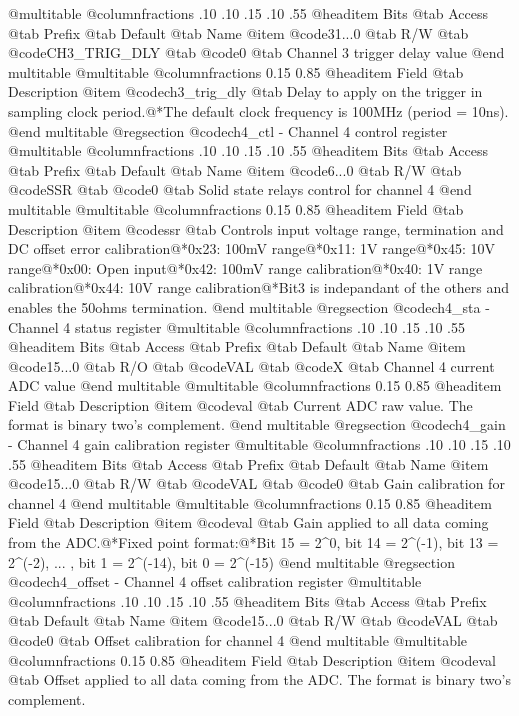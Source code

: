 @multitable @columnfractions .10 .10 .15 .10 .55
@headitem Bits @tab Access @tab Prefix @tab Default @tab Name
@item @code{31...0}
@tab R/W @tab
@code{CH3_TRIG_DLY}
@tab @code{0} @tab 
Channel 3 trigger delay value
@end multitable
@multitable @columnfractions 0.15 0.85
@headitem Field @tab Description
@item @code{ch3_trig_dly} @tab Delay to apply on the trigger in sampling clock period.@*The default clock frequency is 100MHz (period = 10ns).
@end multitable
@regsection @code{ch4_ctl} - Channel 4 control register
@multitable @columnfractions .10 .10 .15 .10 .55
@headitem Bits @tab Access @tab Prefix @tab Default @tab Name
@item @code{6...0}
@tab R/W @tab
@code{SSR}
@tab @code{0} @tab 
Solid state relays control for channel 4
@end multitable
@multitable @columnfractions 0.15 0.85
@headitem Field @tab Description
@item @code{ssr} @tab Controls input voltage range, termination and DC offset error calibration@*0x23: 100mV range@*0x11: 1V range@*0x45: 10V range@*0x00: Open input@*0x42: 100mV range calibration@*0x40: 1V range calibration@*0x44: 10V range calibration@*Bit3 is indepandant of the others and enables the 50ohms termination.
@end multitable
@regsection @code{ch4_sta} - Channel 4 status register
@multitable @columnfractions .10 .10 .15 .10 .55
@headitem Bits @tab Access @tab Prefix @tab Default @tab Name
@item @code{15...0}
@tab R/O @tab
@code{VAL}
@tab @code{X} @tab 
Channel 4 current ADC value
@end multitable
@multitable @columnfractions 0.15 0.85
@headitem Field @tab Description
@item @code{val} @tab Current ADC raw value. The format is binary two's complement.
@end multitable
@regsection @code{ch4_gain} - Channel 4 gain calibration register
@multitable @columnfractions .10 .10 .15 .10 .55
@headitem Bits @tab Access @tab Prefix @tab Default @tab Name
@item @code{15...0}
@tab R/W @tab
@code{VAL}
@tab @code{0} @tab 
Gain calibration for channel 4
@end multitable
@multitable @columnfractions 0.15 0.85
@headitem Field @tab Description
@item @code{val} @tab Gain applied to all data coming from the ADC.@*Fixed point format:@*Bit 15 = 2^0, bit 14 = 2^(-1), bit 13 = 2^(-2), ... , bit 1 = 2^(-14), bit 0 = 2^(-15)
@end multitable
@regsection @code{ch4_offset} - Channel 4 offset calibration register
@multitable @columnfractions .10 .10 .15 .10 .55
@headitem Bits @tab Access @tab Prefix @tab Default @tab Name
@item @code{15...0}
@tab R/W @tab
@code{VAL}
@tab @code{0} @tab 
Offset calibration for channel 4
@end multitable
@multitable @columnfractions 0.15 0.85
@headitem Field @tab Description
@item @code{val} @tab Offset applied to all data coming from the ADC. The format is binary two's complement.
